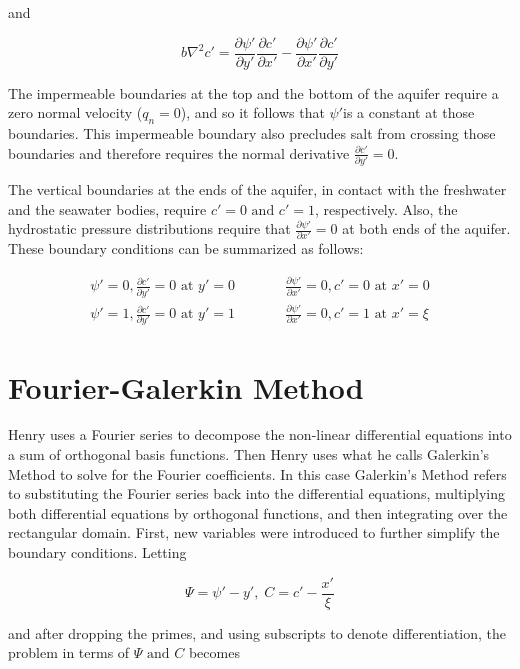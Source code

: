 \documentclass{article}
\newcommand{\pderiv}[2]{\frac{\partial #1}{\partial #2}} %
\newcommand{\spbox}[1]{ \text{ #1 }} %
\newcommand{\csp}{, \;} %
\begin{document}
and

\begin{equation} \label{2.20)} 
    b\nabla ^{2} c'=\pderiv{\psi'}{y'} \pderiv{c'}{x'} -\pderiv{\psi'}{x'} \pderiv{c'}{y'} 
\end{equation} 

The impermeable boundaries at the top and the bottom of the aquifer require a
zero normal velocity ($q_{n} =0$), and so it follows that $\psi '$is a constant
at those boundaries. This impermeable boundary also precludes salt from crossing
those boundaries and therefore requires the normal derivative $\pderiv{c'}{y'} =0$.

The vertical boundaries at the ends of the aquifer, in contact with the
freshwater and the seawater bodies, require $c'=0\spbox{and} c'=1$, respectively.
Also, the hydrostatic pressure distributions require that $\pderiv{\psi'}{x'}
=0$ at both ends of the aquifer. These boundary conditions can
be summarized as follows:

\begin{equation} \label{BC)} \begin{array}{lcr} 
    \psi ' = 0, \pderiv{c'}{y'} =0 \spbox{at} y'=0
    & \qquad
    & \pderiv{\psi'}{x'} = 0, c' = 0 \spbox{at} x'=0 \\
    \psi '= 1, \pderiv{c'}{y'} = 0 \spbox{at} y'=1
    & \qquad
    & \pderiv{\psi'}{x'} =0,  c'=1 \spbox{at} x'=\xi 
\end{array} \end{equation}

\section{Fourier-Galerkin Method}
Henry uses a Fourier series to decompose the non-linear differential equations
into a sum of orthogonal basis functions. Then Henry uses what he calls
Galerkin's Method to solve for the Fourier coefficients. In this case Galerkin's
Method refers to substituting the Fourier series back into the differential
equations, multiplying both differential equations by orthogonal functions, and
then integrating over the rectangular domain. First, new variables were
introduced to further simplify the boundary conditions. Letting

\begin{equation} \label{3.1)} 
    \Psi = \psi '-y'\csp C = c'-\frac{x'}{\xi } 
\end{equation}

and after dropping the primes, and using subscripts to denote differentiation,
the problem in terms of $\Psi \spbox{and} C$ becomes
\end{document}
